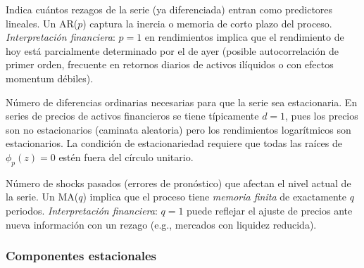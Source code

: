 \documentclass[12pt,a4paper]{article}
\begin{document}
\begin{description}[leftmargin=3em,style=nextline]
  \item[$p$ --- Orden autorregresivo]
    Indica cuántos rezagos de la serie (ya diferenciada) entran como predictores lineales.
    Un AR($p$) captura la inercia o memoria de corto plazo del proceso.
    \textit{Interpretación financiera}: $p=1$ en rendimientos implica que el rendimiento
    de hoy está parcialmente determinado por el de ayer (posible autocorrelación de primer orden,
    frecuente en retornos diarios de activos ilíquidos o con efectos momentum débiles).

  \item[$d$ --- Orden de integración ordinaria]
    Número de diferencias ordinarias necesarias para que la serie sea estacionaria.
    En series de precios de activos financieros se tiene típicamente $d=1$, pues los precios
    son no estacionarios (caminata aleatoria) pero los rendimientos logarítmicos son estacionarios.
    La condición de estacionariedad requiere que todas las raíces de $\phi_p(z) = 0$ estén
    fuera del círculo unitario.

  \item[$q$ --- Orden de media móvil]
    Número de shocks pasados (errores de pronóstico) que afectan el nivel actual de la serie.
    Un MA($q$) implica que el proceso tiene \textit{memoria finita} de exactamente $q$ periodos.
    \textit{Interpretación financiera}: $q=1$ puede reflejar el ajuste de precios ante nueva
    información con un rezago (e.g., mercados con liquidez reducida).
\end{description}

\subsubsection{Componentes estacionales}
\end{document}
